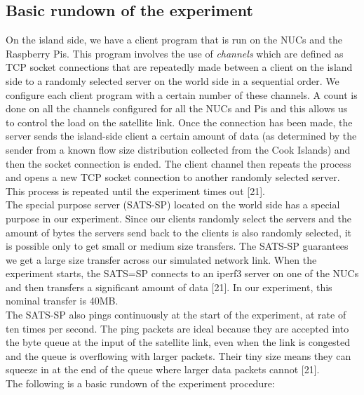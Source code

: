 \documentclass{uathesis}
\begin{document}
\subsection{Basic rundown of the experiment}
On the island side, we have a client program that is run on the NUCs and the Raspberry Pis. This program involves the use of \emph{channels} which are defined as TCP socket connections that are repeatedly made between a client on the island side to a randomly selected server on the world side in a sequential order. We configure each client program with a certain number of these channels. A count is done on all the channels configured for all the NUCs and Pis and this allows us to control the load on the satellite link. Once the connection has been made, the server sends the island-side client a certain amount of data (as determined by the sender from a known flow size distribution collected from the Cook Islands) and then the socket connection is ended. The client channel then repeats the process and opens a new TCP socket connection to another randomly selected server. This process is repeated until the experiment times out [21]. \\

The special purpose server (SATS-SP) located on the world side has a special purpose in our experiment. Since our clients randomly select the servers and the amount of bytes the servers send back to the clients is also randomly selected, it is possible only to get small or medium size transfers. The SATS-SP guarantees we get a large size transfer across our simulated network link. When the experiment starts, the SATS=SP connects to an iperf3 server on one of the NUCs and then transfers a significant amount of data [21]. In our experiment, this nominal transfer is 40MB. \\

The SATS-SP also pings continuously at the start of the experiment, at rate of ten times per second. The ping packets are ideal because they are accepted into the byte queue at the input of the satellite link, even when the link is congested and the queue is overflowing with larger packets. Their tiny size means they can squeeze in at the end of the queue where larger data packets cannot [21].\\

The following is a basic rundown of the experiment procedure:
\end{document}
